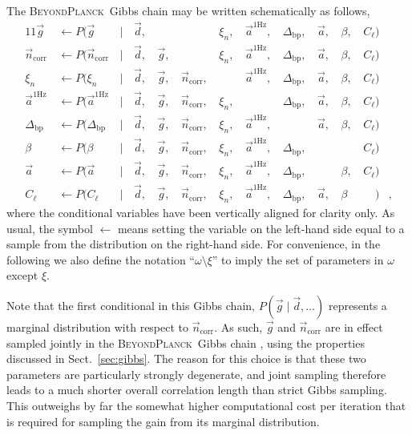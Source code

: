 \documentclass[twocolumn]{aa}
\renewcommand{\d}[0]{\vec{d}}
\newcommand{\n}[0]{\vec{n}}
\renewcommand{\a}[0]{\vec{a}}
\newcommand{\g}[0]{\vec{g}}
\newcommand{\Dbp}[0]{\Delta_{\mathrm{bp}}}
\newcommand{\BP}{\textsc{BeyondPlanck}}
\begin{document}
The \BP\ Gibbs chain may be written schematically as follows,
\begin{alignat}{11}
\g &\,\leftarrow P(\g&\,\mid &\,\d,&\, & &\,\xi_n, &\,\a^{\mathrm{1Hz}}, &\,\Dbp, &\,\a, &\,\beta, &\,C_{\ell})\\
\n_{\mathrm{corr}} &\,\leftarrow P(\n_{\mathrm{corr}}&\,\mid &\,\d, &\,\g, &\,&\,\xi_n,
&\,\a^{\mathrm{1Hz}}, &\,\Dbp, &\,\a, &\,\beta, &\,C_{\ell})\\
\xi_n &\,\leftarrow P(\xi_n&\,\mid &\,\d, &\,\g, &\,\n_{\mathrm{corr}}, &\,
&\,\a^{\mathrm{1Hz}}, &\,\Dbp, &\,\a, &\,\beta, &\,C_{\ell})\\
\a^{\mathrm{1Hz}} &\,\leftarrow P(\a^{\mathrm{1Hz}}&\,\mid &\,\d,
&\,\g, &\,\n_{\mathrm{corr}}, &\,\xi_n, &\,
&\,\Dbp, &\,\a, &\,\beta, &\,C_{\ell})\\
\Dbp &\,\leftarrow P(\Dbp&\,\mid &\,\d, &\,\g, &\,\n_{\mathrm{corr}}, &\,\xi_n,
&\,\a^{\mathrm{1Hz}}, &\,&\,\a, &\,\beta, &\,C_{\ell})\\
\beta &\,\leftarrow P(\beta&\,\mid &\,\d, &\,\g, &\,\n_{\mathrm{corr}}, &\,\xi_n,
&\,\a^{\mathrm{1Hz}}, &\,\Dbp, & &\,&\,C_{\ell})\\
\a &\,\leftarrow P(\a&\,\mid &\,\d, &\,\g, &\,\n_{\mathrm{corr}}, &\,\xi_n,
&\,\a^{\mathrm{1Hz}}, &\,\Dbp, &\,&\,\beta, &\,C_{\ell})\\
C_{\ell} &\,\leftarrow P(C_{\ell}&\,\mid &\,\d, &\,\g, &\,\n_{\mathrm{corr}}, &\,\xi_n,
&\,\a^{\mathrm{1Hz}}, &\,\Dbp, &\,\a, &\,\beta&\,\phantom{C_{\ell}})&,
\end{alignat}
where the conditional variables have been vertically aligned for
clarity only.  As usual, the symbol $\leftarrow$ means setting the
variable on the left-hand side equal to a sample from the distribution
on the right-hand side. For convenience, in the following we also
define the notation ``$\omega\setminus \xi$'' to imply the set of
parameters in $\omega$ except $\xi$.

Note that the first conditional in this Gibbs chain, ${P(\g\mid
  \d,\ldots)}$ represents a marginal distribution with respect to
$\n_{\mathrm{corr}}$. As such, $\g$ and $\n_{\mathrm{corr}}$ are in
effect sampled jointly in the \BP\ Gibbs chain \citep{bp07,bp06},
using the properties discussed in Sect.~\ref{sec:gibbs}. The reason
for this choice is that these two parameters are particularly strongly
degenerate, and joint sampling therefore leads to a much shorter
overall correlation length than strict Gibbs sampling. This outweighs
by far the somewhat higher computational cost per iteration that is
required for sampling the gain from its marginal distribution.
\end{document}
